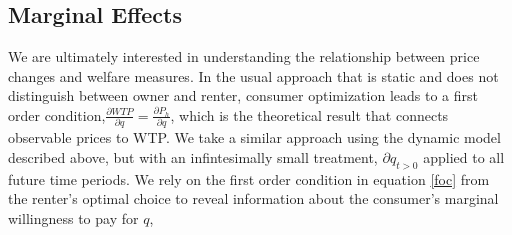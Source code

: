 \documentclass[ecta,nameyear,draft]{econsocart}
\theoremstyle{plain}
\theoremstyle{remark}
\begin{document}
\subsection{Marginal Effects}
We are ultimately interested in understanding the relationship between price changes and welfare measures. In the usual approach that is static and does not distinguish between owner and renter, consumer optimization leads to a first order condition,$\frac{\partial{\mathit{WTP}}}{\partial q}=\frac{\partial P_h}{\partial q}$, which is the theoretical result that connects observable prices to WTP. We take a similar approach using the dynamic model described above, but with an infintesimally small treatment, $\partial q_{t>0}$ applied to all future time periods. We rely on the first order condition in equation \ref{foc} from the renter's optimal choice to reveal information about the consumer's marginal willingness to pay for $q$,
\end{document}
